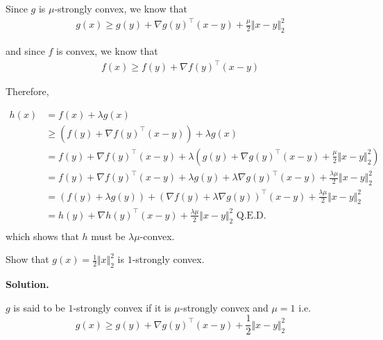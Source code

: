 \documentclass{exam}
\begin{document}
\begin{questions}
\begin{parts}
{            Since $g$ is $\mu$-strongly convex, we know that
            \begin{align*}
                g(x) \geq g(y) + \nabla g(y)^\top (x - y) + \frac{\mu}{2} \Vert x - y \Vert_2^2
            \end{align*}

            and since $f$ is convex, we know that
            \begin{align*}
                f(x) \geq f(y) + \nabla f(y)^\top (x - y)
            \end{align*}

            Therefore,

            \begin{align*}
                h(x) & = f(x) + \lambda g(x)                                                                                                             \\
                     & \geq (f(y) + \nabla f(y)^\top (x - y)) + \lambda g(x)                                                                             \\
                     & = f(y) + \nabla f(y)^\top (x - y) + \lambda (g(y) + \nabla g(y)^\top (x - y) + \frac{\mu}{2} \Vert x - y \Vert_2^2)               \\
                     & = f(y) + \nabla f(y)^\top (x - y) + \lambda g(y) + \lambda \nabla g(y)^\top (x - y) + \frac{\lambda \mu}{2} \Vert x - y \Vert_2^2 \\
                     & = (f(y) + \lambda g(y)) + (\nabla f(y) + \lambda \nabla g(y))^\top(x - y) + \frac{\lambda \mu}{2} \Vert x - y \Vert_2^2           \\
                     & = h(y) + \nabla h(y)^\top(x - y) + \frac{\lambda \mu}{2} \Vert x - y \Vert_2^2 \text{ Q.E.D.}                                     \\
            \end{align*}
            which shows that $h$ must be $\lambda \mu$-convex.
        }

        \hr

        {
            Show that $g(x) = \frac{1}{2} \Vert x \Vert^2_2$ is $1$-strongly convex.

            \textbf{Solution.}

            $g$ is said to be $1$-strongly convex if it is $\mu$-strongly convex and $\mu = 1$ i.e.
            \begin{equation}
                g(x) \geq g(y) + \nabla g(y)^\top (x - y) + \frac{1}{2} \Vert x - y \Vert_2^2
            \end{equation}

}
\end{parts}
\end{questions}
\end{document}
